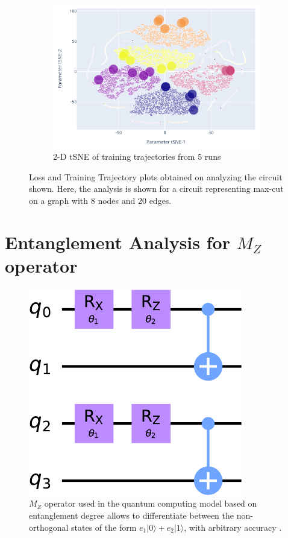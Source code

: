 \documentclass[%
 reprint,
 amsmath,
 amssymb,
 showkeys,
 pra,
 floatfix,
 onecolumn,
]{revtex4-2}
\begin{document}
\begin{figure}[htp]
\begin{subfigure}[b]{0.32\linewidth}
    \end{subfigure}
    \begin{subfigure}[b]{0.32\linewidth}
        \includegraphics[width=\textwidth]{images/supplementary-qleet-3.pdf}
        \caption{2-D tSNE of training trajectories from 5 runs}
    \end{subfigure}%
    \caption{Loss and Training Trajectory plots obtained on analyzing the circuit shown. Here, the analysis is shown for a circuit representing max-cut on a graph with 8 nodes and 20 edges.}
    \label{fig:loss-land-train-traj}
\end{figure}

\section{\label{sec:supl-mz-op}Entanglement Analysis for $M_Z$ operator \cite{Zidan2020}}

\begin{figure}
    \centering
    \includegraphics{images/mzop_circuit.pdf}
    \caption{$M_Z$ operator used in the quantum computing model based on entanglement degree allows to differentiate between the non-orthogonal states of the form $e_1|0\rangle + e_2|1\rangle$, with arbitrary accuracy \cite{Zidan2020, Khan2022, Punla2021, Panda2022}.}
    \label{fig:my_label}
\end{figure}
\end{document}
